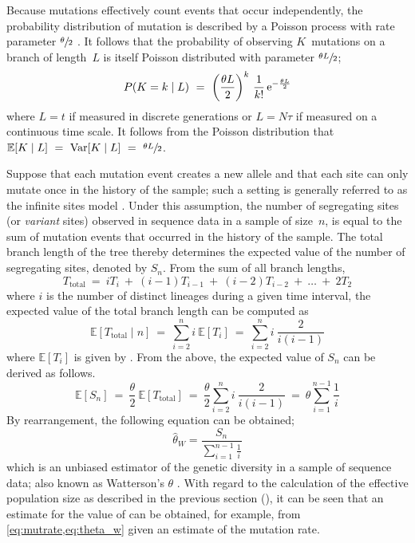 Because mutations effectively count events that occur independently, the probability distribution of mutation is described by a Poisson process with rate parameter ${\sfrac{\theta}{2}}$ \citep{wakeley2008}.
It follows that the probability of observing $K$~mutations on a branch of length~$L$ is itself Poisson distributed with parameter ${\sfrac{\theta L}{2}}$;
\begin{equation}
	P(K = k \mid L) ~=~ \bigg( \frac{\theta L}{2} \bigg)^k ~ \frac{1}{k!} \,\mathrm{e}^{-\frac{\theta L}{2}}
\end{equation}
where ${L=t}$ if measured in discrete generations or ${L=N\tau}$ if measured on a continuous time scale.
It follows from the Poisson distribution that ${\mathbb{E}[K \mid L] ~=~ \operatorname{Var}[K \mid L] ~=~ \sfrac{\theta L}{2}}$.

Suppose that each mutation event creates a new allele and that each site can only mutate once in the history of the sample; such a setting is generally referred to as the infinite sites model \citep{Kimura:1969tn,Watterson:1975ur}.
Under this assumption, the number of segregating sites (or \emph{variant} sites) observed in sequence data in a sample of size~$n$, is equal to the sum of mutation events that occurred in the history of the sample.
The total branch length of the tree thereby determines the expected value of the number of segregating sites, denoted by $S_n$.
From the sum of all branch lengths, \ie
\begin{equation*}
	T_\text{total} ~=~ i T_i ~+~ (i-1) T_{i-1} ~+~ (i-2) T_{i-2} ~+~ \ldots ~+~ 2 T_2
\end{equation*}
where $i$ is the number of distinct lineages during a given time interval,
the expected value of the total branch length can be computed as
\begin{equation}
	\mathbb{E}[T_\text{total} \mid n]
	~=~ \sum_{i=2}^{n} i ~ \mathbb{E}[T_i]
	~=~ \sum_{i=2}^{n} i ~ \frac{2}{i(i-1)}
\end{equation}
where ${\mathbb{E}[T_i]}$ is given by .
From the above, the expected value of $S_n$ can be derived as follows.
\begin{equation}
	\mathbb{E}[S_n]
	~=~ \frac{\theta}{2} ~ \mathbb{E}[T_\text{total}]
	~=~ \frac{\theta}{2} \sum_{i=2}^{n} i ~ \frac{2}{i(i-1)}
	~=~ \theta \sum_{i=1}^{n-1} \frac{1}{i}
\end{equation}
By rearrangement, the following equation can be obtained;
\begin{equation}\label{eq:theta_w}
	\hat{\theta}_W = \frac{S_n}{\sum_{i=1}^{n-1} \frac{1}{i}}
\end{equation}
which is an unbiased estimator of the genetic diversity in a sample of sequence data; also known as Watterson's $\theta$ \citep{Watterson:1975ur}.
With regard to the calculation of the effective population size as described in the previous section (), it can be seen that an estimate for the value of \Ne can be obtained, for example, from \cref{eq:mutrate,eq:theta_w} given an estimate of the mutation rate.


